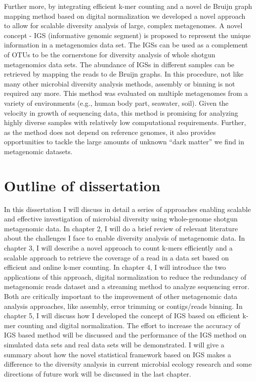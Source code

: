 Further more, by integrating efficient k-mer counting and a novel de Bruijn
graph mapping method based on digital normalization we developed a novel
approach to allow for scalable diversity analysis of large, complex
metagenomes.  A novel concept - IGS (informative genomic segment) is proposed
to represent the unique information in a metagenomics data set. The IGSs can be
used as a complement of OTUs to be the cornerstone for diversity analysis of
whole shotgun metagenomics data sets. The abundance of IGSs in different
samples can be retrieved by mapping the reads to de Bruijn graphs. In this
procedure, not like many other microbial diversity analysis methods, assembly or
binning is not required any more. This method was evaluated on multiple
metagenomes from a variety of environments (e.g., human body part, seawater,
soil). Given the velocity in growth of sequencing data, this method is
promising for analyzing highly diverse samples with relatively low
computational requirements. Further, as the method does not depend on reference
genomes, it also provides opportunities to tackle the large amounts of unknown
``dark matter'' we find in metagenomic datasets.


\section{Outline of dissertation}

In this dissertation I will discuss in detail a series of approaches enabling
scalable and effective investigation of microbial diversity using whole-genome
shotgun metagenomic data. In chapter 2, I will do a brief review of relevant
literature about the challenges I face to enable diversity analysis of
metagenomic data. In chapter 3, I will describe a novel approach to count
k-mers efficiently and a scalable approach to retrieve the coverage of a read
in a data set based on efficient and online k-mer counting. In chapter 4, I
will  introduce the two applications of this approach, digital normalization to
reduce the redundancy of metagenomic reads dataset and a streaming method to
analyze sequencing error. Both are critically important to the improvement of
other metagenomic data analysis approaches, like assembly, error trimming or
contigs/reads binning. In chapter 5, I will discuss how I developed the concept
of IGS based on efficient k-mer counting and digital normalization. The effort
to increase the accuracy of IGS based method will be discussed and the
performance of the IGS method on simulated data sets and real data sets will be
demonstrated. I will give a summary about how the novel statistical framework
based on IGS makes a difference to the diversity analysis in current microbial
ecology research and some directions of future work will be discussed in the
last chapter.


